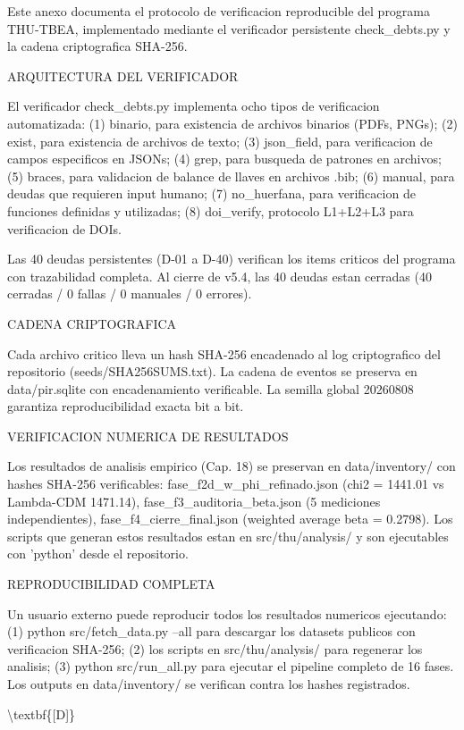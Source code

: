 ﻿\documentclass[11pt,letterpaper]{article}
\begin{document}
Este anexo documenta el protocolo de verificacion reproducible del programa THU-TBEA, implementado mediante el verificador persistente check\_debts.py y la cadena criptografica SHA-256.

ARQUITECTURA DEL VERIFICADOR

El verificador check\_debts.py implementa ocho tipos de verificacion automatizada: (1) binario, para existencia de archivos binarios (PDFs, PNGs); (2) exist, para existencia de archivos de texto; (3) json\_field, para verificacion de campos especificos en JSONs; (4) grep, para busqueda de patrones en archivos; (5) braces, para validacion de balance de llaves en archivos .bib; (6) manual, para deudas que requieren input humano; (7) no\_huerfana, para verificacion de funciones definidas y utilizadas; (8) doi\_verify, protocolo L1+L2+L3 para verificacion de DOIs.

Las 40 deudas persistentes (D-01 a D-40) verifican los items criticos del programa con trazabilidad completa. Al cierre de v5.4, las 40 deudas estan cerradas (40 cerradas / 0 fallas / 0 manuales / 0 errores).

CADENA CRIPTOGRAFICA

Cada archivo critico lleva un hash SHA-256 encadenado al log criptografico del repositorio (seeds/SHA256SUMS.txt). La cadena de eventos se preserva en data/pir.sqlite con encadenamiento verificable. La semilla global 20260808 garantiza reproducibilidad exacta bit a bit.

VERIFICACION NUMERICA DE RESULTADOS

Los resultados de analisis empirico (Cap. 18) se preservan en data/inventory/ con hashes SHA-256 verificables: fase\_f2d\_w\_phi\_refinado.json (chi2 = 1441.01 vs Lambda-CDM 1471.14), fase\_f3\_auditoria\_beta.json (5 mediciones independientes), fase\_f4\_cierre\_final.json (weighted average beta = 0.2798). Los scripts que generan estos resultados estan en src/thu/analysis/ y son ejecutables con 'python' desde el repositorio.

REPRODUCIBILIDAD COMPLETA

Un usuario externo puede reproducir todos los resultados numericos ejecutando: (1) python src/fetch\_data.py --all para descargar los datasets publicos con verificacion SHA-256; (2) los scripts en src/thu/analysis/ para regenerar los analisis; (3) python src/run\_all.py para ejecutar el pipeline completo de 16 fases. Los outputs en data/inventory/ se verifican contra los hashes registrados.

\textbackslash{}textbf\{[D]\}
\end{document}
